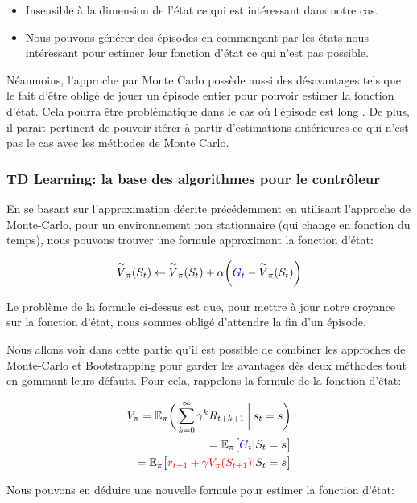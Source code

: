 \begin{itemize}
\item Insensible à la dimension de l'état ce qui est intéressant dans notre cas.
\item Nous pouvons générer des épisodes en commençant par les états nous intéressant pour estimer leur fonction d'état ce qui n'est pas possible.
\end{itemize}

Néanmoins, l'approche par Monte Carlo possède aussi des désavantages tels que le fait d'être obligé de jouer un épisode entier pour pouvoir estimer la fonction d'état. Cela pourra être problématique dans le cas où l'épisode est  long . De plus, il parait pertinent de pouvoir itérer à partir d'estimations antérieures ce qui n'est pas le cas avec les méthodes de Monte Carlo. 

\subsubsection{TD Learning: la base des algorithmes pour le contrôleur}
En se basant sur l'approximation décrite précédemment en utilisant l'approche de Monte-Carlo, pour un environnement non stationnaire (qui change en fonction du temps), nous pouvons trouver une formule approximant la fonction d'état:
 
 \begin{equation}
\overset{\sim}{V}_{\pi}(S_t) \leftarrow \overset{\sim}{V}_{\pi}(S_t) + \alpha \bigg(\textcolor{blue}{G_t} - \overset{\sim}{V}_{\pi}(S_t)\bigg)
\end{equation}
 
Le problème de la formule ci-dessus est que, pour mettre à jour notre croyance sur la fonction d'état, nous sommes obligé d'attendre la fin d'un épisode.

Nous allons voir dans cette partie qu'il est possible de combiner les approches de Monte-Carlo et Bootstrapping pour garder les avantages dès deux méthodes tout en gommant leurs défauts. Pour cela, rappelons la formule de la fonction d'état: 

\begin{align*}
V_{\pi} = \mathbb{E_\pi}\bigg(\sum_{k=0}^{\infty} \gamma^kR_{t+k+1} \:\bigg\vert\: s_t=s \bigg) \\
= \mathbb{E}_\pi \big[\textcolor{blue}{G_t} \vert S_t = s\big] \\
= \mathbb{E}_\pi \big[\textcolor{red}{r_{t+1} + \gamma V_{\pi}(S_{t+1})} \vert S_t = s\big]
\end{align*}
 
Nous pouvons en déduire une nouvelle formule pour estimer la fonction d'état:
 
